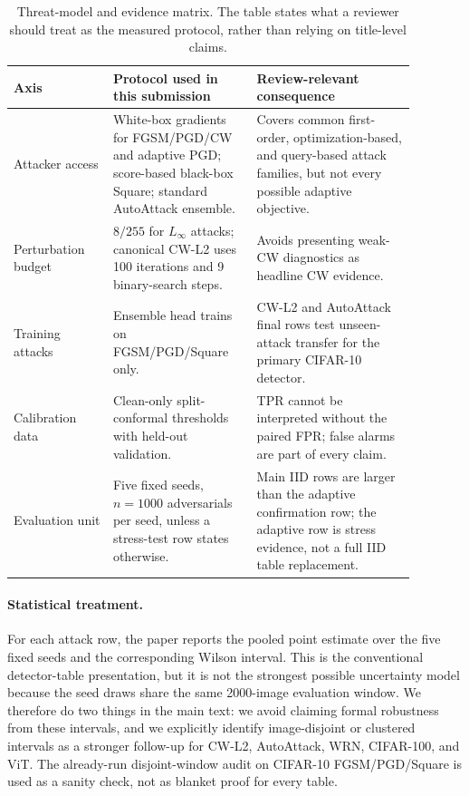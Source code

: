 \documentclass{article}
\begin{document}
\begin{table}[t]
\centering
\small
\setlength{\tabcolsep}{4pt}
\begin{tabular}{p{0.22\linewidth}p{0.31\linewidth}p{0.35\linewidth}}
\toprule
Axis & Protocol used in this submission & Review-relevant consequence \\
\midrule
Attacker access & White-box gradients for FGSM/PGD/CW and adaptive PGD; score-based black-box Square; standard AutoAttack ensemble. & Covers common first-order, optimization-based, and query-based attack families, but not every possible adaptive objective. \\
Perturbation budget & $8/255$ for $L_\infty$ attacks; canonical CW-L2 uses 100 iterations and 9 binary-search steps. & Avoids presenting weak-CW diagnostics as headline CW evidence. \\
Training attacks & Ensemble head trains on FGSM/PGD/Square only. & CW-L2 and AutoAttack final rows test unseen-attack transfer for the primary CIFAR-10 detector. \\
Calibration data & Clean-only split-conformal thresholds with held-out validation. & TPR cannot be interpreted without the paired FPR; false alarms are part of every claim. \\
Evaluation unit & Five fixed seeds, $n=1000$ adversarials per seed, unless a stress-test row states otherwise. & Main IID rows are larger than the adaptive confirmation row; the adaptive row is stress evidence, not a full IID table replacement. \\
\bottomrule
\end{tabular}
\caption{Threat-model and evidence matrix. The table states what a reviewer should treat as the measured protocol, rather than relying on title-level claims.}
\label{tab:threat_matrix}
\end{table}

\paragraph{Statistical treatment.}
For each attack row, the paper reports the pooled point estimate over the five fixed seeds and the corresponding Wilson interval. This is the conventional detector-table presentation, but it is not the strongest possible uncertainty model because the seed draws share the same 2000-image evaluation window. We therefore do two things in the main text: we avoid claiming formal robustness from these intervals, and we explicitly identify image-disjoint or clustered intervals as a stronger follow-up for CW-L2, AutoAttack, WRN, CIFAR-100, and ViT. The already-run disjoint-window audit on CIFAR-10 FGSM/PGD/Square is used as a sanity check, not as blanket proof for every table.
\end{document}
